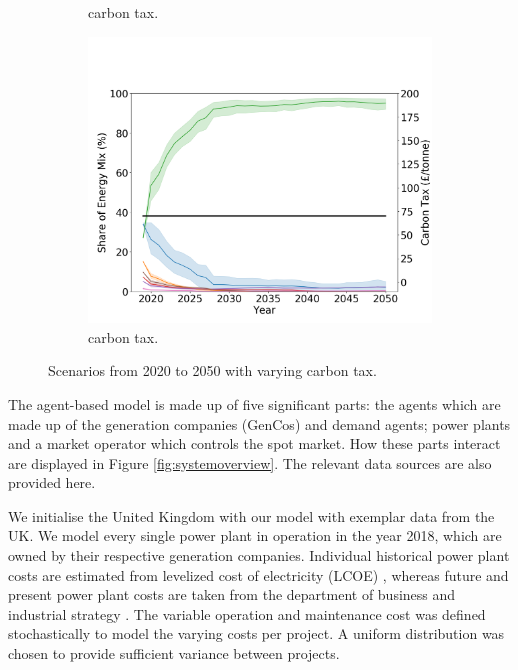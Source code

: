 \begin{figure}[h]
\begin{subfigure}[b]{0.33\textwidth}
		\caption[]%
		{ carbon tax.}
		\label{fig:demand99carbon20}
	\end{subfigure}
	\begin{subfigure}[b]{0.33\textwidth}
		\centering
		\includegraphics[width=\textwidth]{figures/scenarios/demand099-carbon70-datetime.png}
		\caption[Network2]%
		{\small {} carbon tax.}
		\label{fig:demand99carbon70}
	\end{subfigure}
	\caption{Scenarios from 2020 to 2050 with varying carbon tax.}
\end{figure}


The agent-based model is made up of five significant parts: the agents which are made up of the generation companies (GenCos) and demand agents; power plants and a market operator which controls the spot market. How these parts interact are displayed in Figure \ref{fig:systemoverview}. The relevant data sources are also provided here.

We initialise the United Kingdom with our model with exemplar data from the UK. We model every single power plant in operation in the year 2018, which are owned by their respective generation companies. Individual historical power plant costs are estimated from levelized cost of electricity (LCOE) \cite{Dale2013, IEA2015,IRENA2018}, whereas future and present power plant costs are taken from the department of business and industrial strategy \cite{Department2016}. The variable operation and maintenance cost was defined stochastically to model the varying costs per project. A uniform distribution was chosen to provide sufficient variance between projects.

